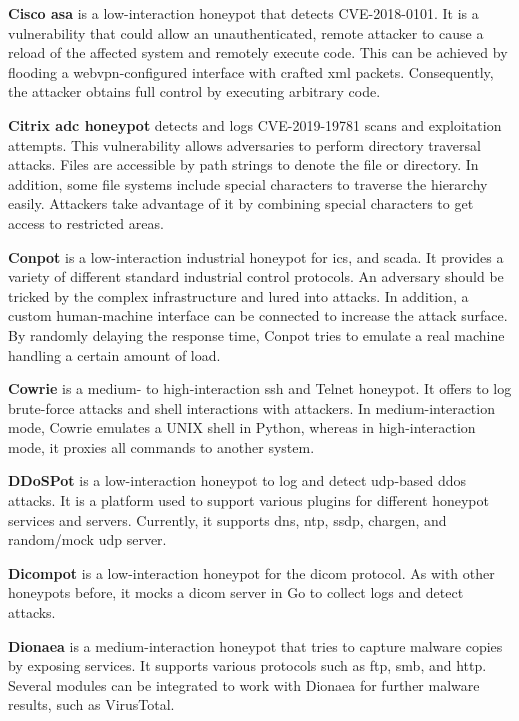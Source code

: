 \textbf{Cisco \ac{asa}} \cite{cymmetria2018} is a low-interaction honeypot that detects CVE-2018-0101\cite{CVE-2018-0101}.
It is a vulnerability that could allow an unauthenticated, remote attacker to cause a reload of the affected system and remotely execute code.
This can be achieved by flooding a webvpn-configured interface with crafted \ac{xml} packets.
Consequently, the attacker obtains full control by executing arbitrary code.

\textbf{Citrix \ac{adc} honeypot} \cite{citrixhoneypot2020} detects and logs CVE-2019-19781\cite{CVE-2019-19781} scans and exploitation attempts.
This vulnerability allows adversaries to perform directory traversal attacks.
Files are accessible by path strings to denote the file or directory.
In addition, some file systems include special characters to traverse the hierarchy easily.
Attackers take advantage of it by combining special characters to get access to restricted areas. \cite{flanders2019}

\textbf{Conpot} \cite{conpot2021} is a low-interaction industrial honeypot for \ac{ics}, and \ac{scada}.
It provides a variety of different standard industrial control protocols.
An adversary should be tricked by the complex infrastructure and lured into attacks.
In addition, a custom human-machine interface can be connected to increase the attack surface.
By randomly delaying the response time, Conpot tries to emulate a real machine handling a certain amount of load.

\textbf{Cowrie} \cite{cowrie2021} is a medium- to high-interaction \ac{ssh} and Telnet honeypot.
It offers to log brute-force attacks and shell interactions with attackers.
In medium-interaction mode, Cowrie emulates a UNIX shell in Python, whereas in high-interaction mode, it proxies all commands to another system.

\textbf{DDoSPot} \cite{ddosspot2021} is a low-interaction honeypot to log and detect \ac{udp}-based \ac{ddos} attacks.
It is a platform used to support various plugins for different honeypot services and servers.
Currently, it supports \ac{dns}, \ac{ntp}, \ac{ssdp}, \ac{chargen}, and random/mock \ac{udp} server.

\textbf{Dicompot} \cite{dicompot2021} is a low-interaction honeypot for the \ac{dicom} protocol.
As with other honeypots before, it mocks a \ac{dicom} server in Go to collect logs and detect attacks.

\textbf{Dionaea} \cite{dionaea2021} is a medium-interaction honeypot that tries to capture malware copies by exposing services.
It supports various protocols such as \ac{ftp}, \ac{smb}, and \ac{http}.
Several modules can be integrated to work with Dionaea for further malware results, such as VirusTotal.

